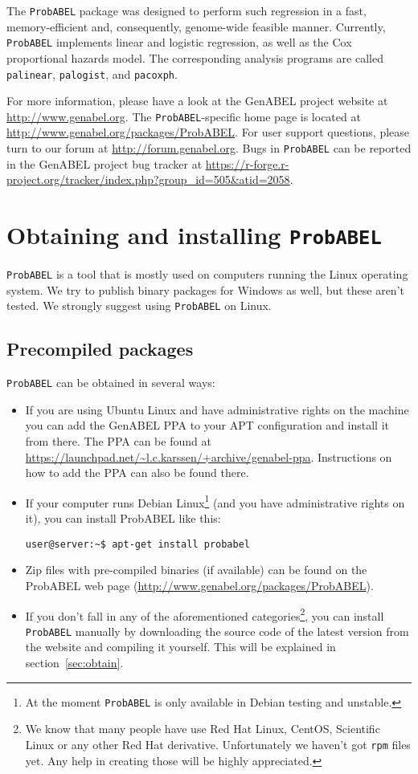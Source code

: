 \documentclass[12pt,a4paper]{article}
\newcommand{\PA}{\texttt{ProbABEL}}
\begin{document}
The \PA{} package was designed to perform such regression
in a fast, memory-efficient and, consequently, genome-wide feasible manner.
Currently, \PA{} implements linear and logistic regression,
as well as the Cox proportional hazards model. The corresponding analysis
programs are called \texttt{palinear},  \texttt{palogist},
and \texttt{pacoxph}.

For more information, please have a look at the GenABEL project
website at \url{http://www.genabel.org}. The \PA{}-specific home
page is located at
\url{http://www.genabel.org/packages/ProbABEL}. For user support
questions, please turn to our forum at
\url{http://forum.genabel.org}. Bugs in \PA{} can be reported in the
GenABEL project bug tracker at
\url{https://r-forge.r-project.org/tracker/index.php?group_id=505&atid=2058}.

\section{Obtaining and installing \PA}
\label{sec:obtaininstall}
\PA{} is a tool that is mostly used on computers running the Linux
operating system. We try to publish binary packages for Windows as
well, but these aren't tested. We strongly suggest using \PA{} on
Linux.

\subsection{Precompiled packages}
\PA{} can be obtained in several ways:
\begin{itemize}
\item If you are using Ubuntu Linux and have administrative rights on
  the machine you can add the GenABEL PPA to your APT configuration
  and install it from there. The PPA can be found at
  \url{https://launchpad.net/~l.c.karssen/+archive/genabel-ppa}. Instructions
  on how to add the PPA can also be found there.
\item If your computer runs Debian Linux\footnote{At the moment \PA{}
    is only available in Debian testing and unstable.} (and you have
  administrative rights on it), you can install ProbABEL like this:
  \begin{lstlisting}[basicstyle=\footnotesize\ttfamily,]
user@server:~$ apt-get install probabel
  \end{lstlisting}
\item Zip files with pre-compiled binaries (if available) can be found
  on the ProbABEL web page
  (\url{http://www.genabel.org/packages/ProbABEL}).
\item If you don't fall in any of the aforementioned
  categories\footnote{We know that many people have use Red Hat Linux,
    CentOS, Scientific Linux or any other Red Hat
    derivative. Unfortunately we haven't got \texttt{rpm} files
    yet. Any help in creating those will be highly appreciated.}, you
  can install \PA{} manually by downloading the source code of the
  latest version from the website and compiling it yourself. This will
  be explained in section~\ref{sec:obtain}.
\end{itemize}
\end{document}
